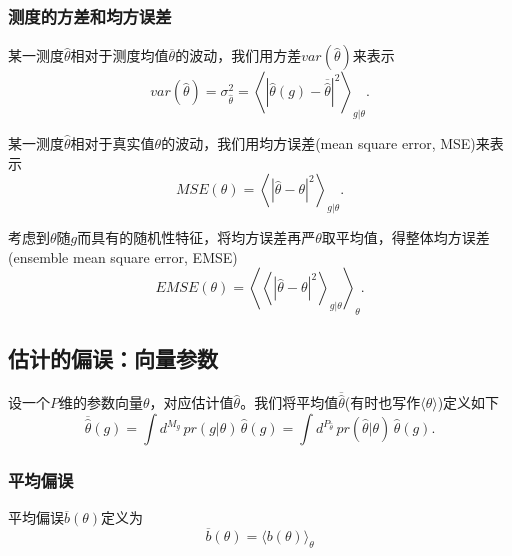 \subsubsection{测度的方差和均方误差}
\label{sec:mle-estimate-var-mse}
某一测度$\hat{\theta}$相对于测度均值$\overline{\theta}$的波动，我们用方差$var \left( \hat{\theta} \right)$来表示
\begin{equation}
  \label{eq:mle-variance-hat}
  var \left( \hat{\theta} \right)
  = \sigma_{\hat{\theta}}^{2}
  = \left\langle
  \left|
  \hat{\theta}(g) - \overline{\hat{\theta}}
  \right|^{2}
  \right\rangle_{g | \theta}.
\end{equation}

某一测度$\hat{\theta}$相对于真实值$\theta$的波动，我们用均方误差(mean square error, MSE)来表示
\begin{equation}
  \label{eq:mle-mse-def}
  MSE(\theta) = \left\langle
  \left| \hat{\theta} - \theta \right|^{2}
  \right\rangle_{g | \theta}.
\end{equation}

考虑到$\theta$随$g$而具有的随机性特征，将均方误差再严$\theta$取平均值，得整体均方误差(ensemble mean square error, EMSE)
\begin{equation}
  \label{eq:mle-emse-def}
  EMSE(\theta) =
  \left\langle
  \left\langle
  \left| \hat{\theta} - \theta \right|^{2}
  \right\rangle_{g|\theta}
  \right\rangle_{\theta}.
\end{equation}

\subsection{估计的偏误：向量参数}
\label{sec:mle-bias-vector}
设一个$P$维的参数向量$\theta$，对应估计值$\hat{\theta}$。我们将平均值$\overline{\hat{\theta}}$(有时也写作$\langle \theta \rangle$)定义如下
\begin{equation}
  \label{eq:mle-estimate-vector}
  \overline{\hat{\theta}} \left( g \right) = \int d^{M_g} \, pr \left(g | \theta \right) \, \hat{\theta}\left ( g \right) = \int d^{P_{\hat{\theta}}} \, pr \left( \hat{\theta} | \theta \right) \, \hat{\theta}\left( g \right).
\end{equation}

\subsubsection{平均偏误}
平均偏误$\overline{b}\left( \theta \right)$定义为
\begin{equation}
  \label{eq:mle-estimate-vector-bias-avg}
  \overline{b}(\theta) =
  \langle b \left( \theta \right) \rangle_{\theta}
\end{equation}

